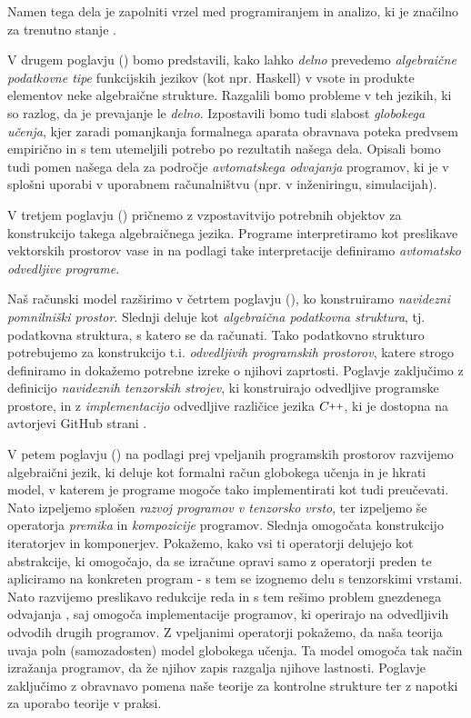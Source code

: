\documentclass[a4paper, 12pt]{book}
\newcommand{\CC}{C\nolinebreak\hspace{-.05em}\raisebox{.4ex}{\tiny\bf +}\nolinebreak\hspace{-.10em}\raisebox{.4ex}{\tiny\bf +}}
\def\CC{{C\nolinebreak[4]\hspace{-.05em}\raisebox{.4ex}{\tiny\bf ++}}}
\begin{document}
Namen tega dela je zapolniti vrzel med programiranjem in analizo, ki je značilno za trenutno stanje \cite{AD2}. 

V drugem poglavju (\emph{}) bomo predstavili, kako lahko \emph{delno} prevedemo \emph{algebraične podatkovne tipe} funkcijskih jezikov (kot npr. Haskell) v vsote in produkte elementov neke algebraične strukture. Razgalili bomo probleme v teh jezikih, ki so razlog, da je prevajanje le \emph{delno}. Izpostavili bomo tudi slabost \emph{globokega učenja}, kjer zaradi pomanjkanja formalnega aparata obravnava poteka predvsem empirično in s tem utemeljili potrebo po rezultatih našega dela. Opisali bomo tudi pomen našega dela za področje \emph{avtomatskega odvajanja} programov, ki je v splošni uporabi v uporabnem računalništvu (npr. v inženiringu, simulacijah).

V tretjem poglavju (\emph{}) pričnemo z vzpostavitvijo potrebnih objektov za konstrukcijo takega algebraičnega jezika. Programe interpretiramo kot preslikave vektorskih prostorov vase in na podlagi take interpretacije definiramo \emph{avtomatsko odvedljive programe}. 

Naš računski model razširimo v četrtem poglavju (\emph{}), ko konstruiramo \emph{navidezni pomnilniški prostor}. Slednji deluje kot \emph{algebraična podatkovna struktura}, tj. podatkovna struktura, s katero se da računati. Tako podatkovno strukturo potrebujemo za konstrukcijo t.i. \emph{odvedljivih programskih prostorov}, katere strogo definiramo in dokažemo potrebne izreke o njihovi zaprtosti. Poglavje zaključimo z definicijo \emph{navideznih tenzorskih strojev}, ki konstruirajo odvedljive programske prostore, in z \emph{implementacijo} odvedljive različice jezika $\CC$, ki je dostopna na avtorjevi GitHub strani \cite{dC++}.

V petem poglavju (\emph{}) na podlagi prej vpeljanih programskih prostorov razvijemo algebraični jezik, ki deluje kot formalni račun globokega učenja in je hkrati model, v katerem je programe mogoče tako implementirati kot tudi preučevati. Nato izpeljemo splošen \emph{razvoj programov v tenzorsko vrsto}, ter izpeljemo še operatorja \emph{premika} in \emph{kompozicije} programov. Slednja omogočata konstrukcijo iteratorjev in komponerjev. Pokažemo, kako vsi ti operatorji delujejo kot abstrakcije, ki omogočajo, da se izračune opravi samo z operatorji preden te apliciramo na konkreten program - s tem se izognemo delu s tenzorskimi vrstami. 
Nato razvijemo preslikavo redukcije reda in s tem rešimo problem gnezdenega odvajanja \cite{AD2}, saj omogoča implementacije programov, ki operirajo na odvedljivih odvodih drugih programov.
Z vpeljanimi operatorji pokažemo, da naša teorija uvaja poln (samozadosten) model globokega učenja. Ta model omogoča tak način izražanja programov, da že njihov zapis razgalja njihove lastnosti. Poglavje zaključimo z obravnavo pomena naše teorije za kontrolne strukture ter z napotki za uporabo teorije v praksi.
\end{document}
